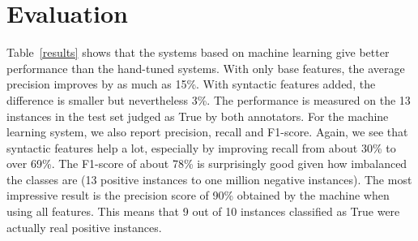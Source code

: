 \documentclass[11pt]{article}
\newcommand{\mn}[1]{\textbf{#1}}
\begin{document}
%
%
%

\section{Evaluation}

Table~\ref{results} shows that the systems based on machine learning give better performance than the hand-tuned systems. With only base features, the average precision improves by as much as 15\%. With syntactic features added, the difference is smaller but nevertheless 3\%. The performance is measured on the 13 instances in the test set judged as True by both annotators. For the machine learning system, we also report precision, recall and F1-score. Again, we see that syntactic features help a lot, especially by improving recall from about 30\% to over 69\%. The F1-score of about 78\% is surprisingly good given how imbalanced the classes are (13 positive instances to one million negative instances). The most impressive result is the precision score of 90\% obtained by the machine when using all features. This means that 9 out of 10 instances classified as True were actually real positive instances. 



\end{document}
